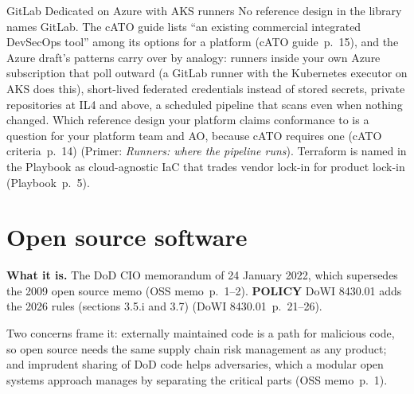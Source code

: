 \documentclass[11pt,letterpaper,twoside,openany]{memoir}
\newcommand{\pg}[2]{{\small(#1~p.~#2)}}          %
\newcommand{\st}[1]{{\sffamily\scriptsize\bfseries #1}}   %
\begin{document}
\begin{boxteam}{GitLab Dedicated on Azure with AKS runners}
No reference design in the library names GitLab. The cATO guide lists ``an existing commercial integrated DevSecOps
tool'' among its options for a platform \pg{cATO guide}{15}, and the Azure draft's patterns carry over by analogy:
runners inside your own Azure subscription that poll outward (a GitLab runner with the Kubernetes executor on AKS does
this), short-lived federated credentials instead of stored secrets, private repositories at IL4 and above, a scheduled
pipeline that scans even when nothing changed. Which reference design your platform claims conformance to is a
question for your platform team and AO, because cATO requires one \pg{cATO criteria}{14} (Primer: \emph{Runners: where
the pipeline runs}). Terraform is named in the Playbook as cloud-agnostic IaC that trades vendor lock-in for product
lock-in \pg{Playbook}{5}.
\end{boxteam}

\chapter{Open source software}\label{ch:oss}

\textbf{What it is.} The DoD CIO memorandum of 24 January 2022, which supersedes the 2009 open source memo
\pg{OSS memo}{1--2}. \st{POLICY} DoWI 8430.01 adds the 2026 rules (sections 3.5.i and 3.7) \pg{DoWI 8430.01}{21--26}.

Two concerns frame it: externally maintained code is a path for malicious code, so open source needs the same supply
chain risk management as any product; and imprudent sharing of DoD code helps adversaries, which a modular open systems
approach manages by separating the critical parts \pg{OSS memo}{1}.
\end{document}
